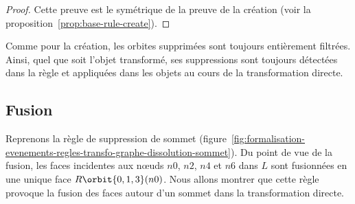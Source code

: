 \begin{proof}
	Cette preuve est le symétrique de la preuve de la création (voir la proposition~\ref{prop:base-rule-create}).
\end{proof}





Comme pour la création, les orbites supprimées sont toujours entièrement
filtrées. %
Ainsi, quel que soit l'objet transformé, ses suppressions sont toujours
détectées dans la règle et appliquées dans les objets au cours de la
transformation directe. %


\subsection{Fusion}
\label{sec:formalisation-evenements-regles-transfo-graphe-fusion}


Reprenons la règle de suppression de sommet (figure~\ref{fig:formalisation-evenements-regles-transfo-graphe-dissolution-sommet}). %
Du point de vue de la fusion, les faces incidentes aux n\oe uds $n0$, $n2$, $n4$ et $n6$
dans $L$ sont fusionnées en une unique face $R\orbit{0,1,3}(n0)$. %
Nous allons montrer que cette règle provoque la fusion des faces autour d'un sommet dans la transformation directe. %

